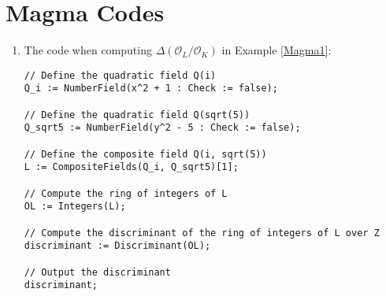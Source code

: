 \appendix
\section{Magma Codes}
\begin{enumerate}
    \item \label{MagmaCode1} The code when computing $\Delta(\mathcal{O}_L/\mathcal{O}_K)$ in Example \ref{Magma1}:
    \begin{verbatim}
// Define the quadratic field Q(i)
Q_i := NumberField(x^2 + 1 : Check := false);

// Define the quadratic field Q(sqrt(5))
Q_sqrt5 := NumberField(y^2 - 5 : Check := false);

// Define the composite field Q(i, sqrt(5))
L := CompositeFields(Q_i, Q_sqrt5)[1];

// Compute the ring of integers of L
OL := Integers(L);

// Compute the discriminant of the ring of integers of L over Z
discriminant := Discriminant(OL);

// Output the discriminant
discriminant;
    \end{verbatim}
\end{enumerate}
